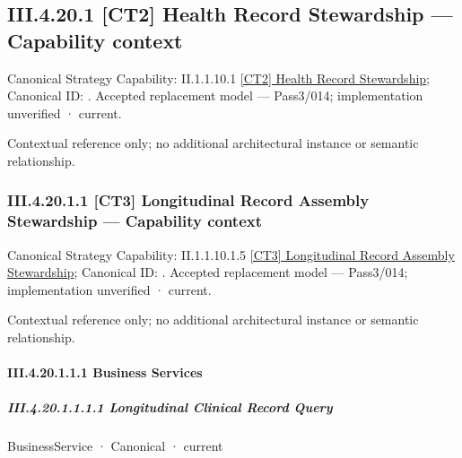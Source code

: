 \subsection*{III.4.20.1 [CT2] Health Record Stewardship — Capability context}
\label{navigation:III.4.20.1}

{\small Canonical Strategy Capability: II.1.1.10.1 \hyperref[element:8532e6d5a687459b9defad56f837fa0a]{[CT2] Health Record Stewardship}; Canonical ID: \texttt{}. Accepted replacement model — Pass3/014; implementation unverified · current.}\par
Contextual reference only; no additional architectural instance or semantic relationship.\par
\subsubsection*{III.4.20.1.1 [CT3] Longitudinal Record Assembly Stewardship — Capability context}
\label{navigation:III.4.20.1.1}

{\small Canonical Strategy Capability: II.1.1.10.1.5 \hyperref[element:4507ca47f4bd40c085e069ac6e42888b]{[CT3] Longitudinal Record Assembly Stewardship}; Canonical ID: \texttt{}. Accepted replacement model — Pass3/014; implementation unverified · current.}\par
Contextual reference only; no additional architectural instance or semantic relationship.\par
\paragraph*{III.4.20.1.1.1 Business Services}
\label{navigation:III.4.20.1.1.1}

\subparagraph*{III.4.20.1.1.1.1 Longitudinal Clinical Record Query}
\label{navigation:III.4.20.1.1.1.1}

\label{element:df10431b93bf47dfae2b8ec7b3e6552b}
{\small BusinessService · Canonical · current}\par

